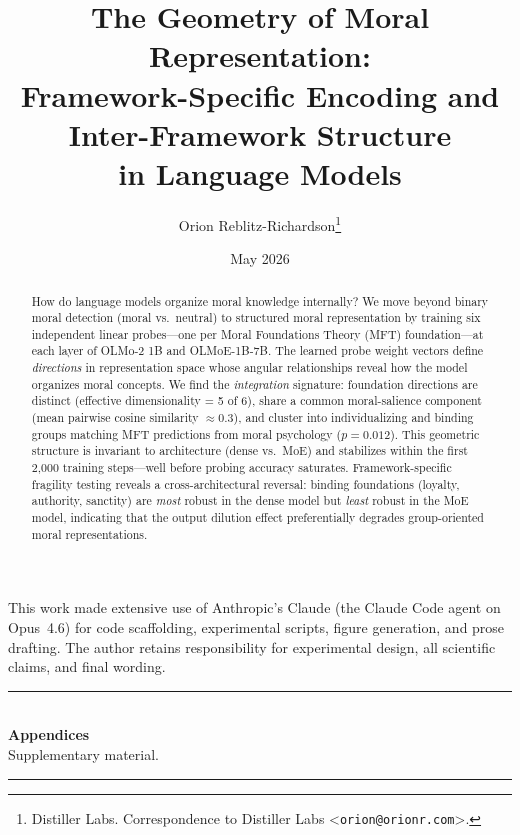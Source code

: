 \documentclass{article}
\title{The Geometry of Moral Representation:\\
  Framework-Specific Encoding and Inter-Framework Structure\\
  in Language Models}
\author{%
  Orion Reblitz-Richardson\thanks{%
    Distiller Labs. Correspondence to Distiller Labs
    \textless\texttt{orion@orionr.com}\textgreater.}
}
\date{May 2026}
\begin{document}
\maketitle

\begin{abstract}
How do language models organize moral knowledge internally? We
move beyond binary moral detection (moral vs.\ neutral) to
structured moral representation by training six independent
linear probes---one per Moral Foundations Theory (MFT) foundation---at
each layer of OLMo-2 1B and OLMoE-1B-7B. The learned probe weight
vectors define \emph{directions} in representation space whose
angular relationships reveal how the model organizes moral concepts.
We find the \emph{integration} signature: foundation directions are
distinct (effective dimensionality = 5 of 6), share a common
moral-salience component (mean pairwise cosine similarity
$\approx$0.3), and cluster into individualizing and binding groups
matching MFT predictions from moral psychology ($p = 0.012$).
This geometric structure is invariant to architecture (dense
vs.\ MoE) and stabilizes within the first 2{,}000 training steps---well
before probing accuracy saturates. Framework-specific fragility
testing reveals a cross-architectural reversal: binding foundations
(loyalty, authority, sanctity) are \emph{most} robust in the dense
model but \emph{least} robust in the MoE model, indicating that
the output dilution effect preferentially degrades group-oriented
moral representations.
\end{abstract}








\begin{ack}
This work made extensive use of Anthropic's Claude (the Claude Code
agent on Opus~4.6) for code scaffolding, experimental scripts,
figure generation, and prose drafting. The author retains
responsibility for experimental design, all scientific claims, and
final wording.
\end{ack}



\appendix
\newpage
\begin{center}
  \rule{0.5\linewidth}{0.4pt}\\[0.6em]
  {\Large\bfseries Appendices}\\[0.25em]
  {\small Supplementary material.}\\[0.4em]
  \rule{0.5\linewidth}{0.4pt}
\end{center}
\vspace{0.5em}






\end{document}
